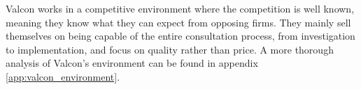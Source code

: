 Valcon works in a competitive environment where the competition is well known, meaning they know what they can expect from opposing firms. 
They mainly sell themselves on being capable of the entire consultation process, from investigation to implementation, and focus on quality rather than price.
A more thorough analysis of Valcon's environment can be found in appendix \ref{app:valcon_environment}.